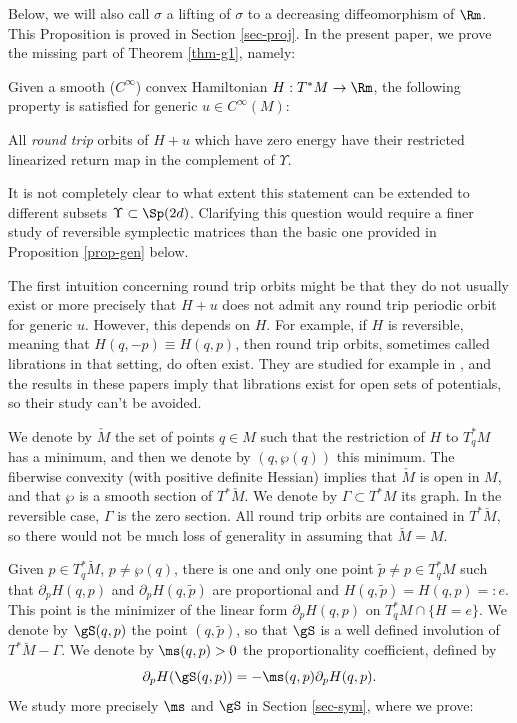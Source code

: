 Below, we will also call $\sigma$ a lifting of $\sigma$ to a decreasing diffeomorphism of $\Rm$.
This Proposition is proved in Section \ref{sec-proj}.
In the present paper, we prove the missing part of Theorem \ref{thm-g1}, namely:

\begin{thm}\label{thm-g3}
Given a smooth ($C^{\infty}$) convex Hamiltonian $H: T^*M\rightarrow \Rm$,
the following property is satisfied for generic $u\in C^{\infty}(M)$:

All \emph{round trip}
orbits of $H+u$ which have zero energy have their restricted linearized
return map in the complement of $\Upsilon$.
\end{thm}

It is not completely clear to what extent this statement can be extended to different subsets $\Upsilon \subset \Sp(2d)$. Clarifying this question would require a finer study of reversible symplectic matrices than the basic one provided in Proposition \ref{prop-gen} below.

The first intuition concerning round trip orbits might be that they do not usually exist or more precisely that $H+u$ does not admit
any round trip periodic orbit for generic $u$. However, this depends on $H$. For example, if $H$ is reversible, meaning that
$H(q,-p)\equiv H(q,p)$, then round trip orbits, sometimes called librations in that setting, do often exist.
They are studied for example in \cite{BK,K76}, and the results in these papers imply that librations exist for open sets of potentials, so their study can't be avoided.

We denote by $\check M$ the set of points $q\in M$ such that the restriction of $H$ to $T^*_qM$ has a minimum,
and then we denote by $(q, \wp(q))$ this minimum. The fiberwise convexity (with positive definite Hessian) implies
that $\check M$ is open in $M$, and that $\wp$ is a smooth section of $T^*\check M$.
We denote by $\Gamma\subset T^*M$ its graph. In the reversible case, $\Gamma$ is the zero section.
All round trip orbits are contained in $T^*\breve M$, so there would not be much loss of generality in assuming that $\breve M=M$.

Given $p\in T^*_q\breve M$, $p\neq \wp(q)$, there is one and only one point
$\tilde p\neq p\in T^*_qM$ such that $\partial_pH(q,p)$ and $\partial_pH(q, \tilde p)$ are proportional and $H(q,\tilde p)=H(q,p)=:e$. This point is the minimizer of the linear form
$\partial_p H(q,p)$ on $T^*_qM\cap \{H= e\}$. We denote by $\gS(q,p)$ the point
$(q, \tilde p)$, so that $\gS$ is a well defined involution of $T^*\breve M-\Gamma$. We denote by $\ms(q,p)>0$ the proportionality coefficient, defined by
\[
\partial_pH(\gS(q,p))= -\ms(q,p)\partial_pH(q,p).
\]
We study more precisely $\ms$ and $\gS$ in Section \ref{sec-sym}, where we prove:


